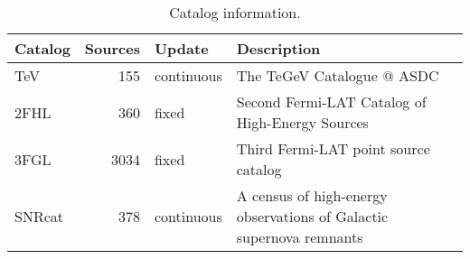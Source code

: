 \begin{table}[h]

\caption{Catalog information.}
\label{tab:a}
\begin{tabular}{ lrll }
\hline


Catalog & Sources & Update & Description \\ \hline
TeV & 155 & continuous & The TeGeV Catalogue @ ASDC\\
2FHL & 360 & fixed & Second Fermi-LAT Catalog of High-Energy Sources\\
3FGL & 3034 & fixed & Third Fermi-LAT point source catalog\\
SNRcat & 378 & continuous & A census of high-energy observations of Galactic supernova remnants\\
\hline
\end{tabular}
\end{table}

